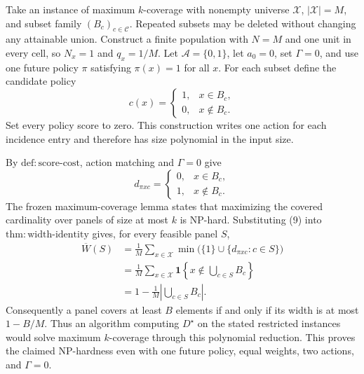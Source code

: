 Take an instance of maximum \(k\)-coverage with nonempty universe
\(\mathcal X\), \(|\mathcal X|=M\), and subset family
\((B_c)_{c\in\mathcal C}\).  Repeated subsets may be deleted without
changing any attainable union.  Construct a finite population with
\(N=M\) and one unit in every cell, so \(N_x=1\) and \(q_x=1/M\).  Let
\(\mathcal A=\{0,1\}\), let \(a_0=0\), set \(\Gamma=0\), and use one
future policy \(\pi\) satisfying \(\pi(x)=1\) for all \(x\).  For each
subset define the candidate policy
\[
c(x)=
\begin{cases}
1,&x\in B_c,\\
0,&x\notin B_c.
\end{cases}
\]
Set every policy score to zero.  This construction writes one action for
each incidence entry and therefore has size polynomial in the input size.

By \(\mathrm{def{:}score\text{-}cost}\), action matching and
\(\Gamma=0\) give
\[
d_{\pi xc}=
\begin{cases}
0,&x\in B_c,\\
1,&x\notin B_c.
\end{cases}                                                           \tag{9}
\]
The frozen maximum-coverage lemma states that maximizing the covered
cardinality over panels of size at most \(k\) is NP-hard.  Substituting (9)
into \(\mathrm{thm{:}width\text{-}identity}\) gives, for every feasible
panel \(S\),
\[
\begin{aligned}
\overline W(S)
&=\frac1M\sum_{x\in\mathcal X}
  \min\bigl(\{1\}\cup\{d_{\pi xc}:c\in S\}\bigr)\\
&=\frac1M\sum_{x\in\mathcal X}
  \mathbf 1\!\left\{x\notin\bigcup_{c\in S}B_c\right\}\\
&=1-\frac1M\left|\bigcup_{c\in S}B_c\right|.                         \tag{10}
\end{aligned}
\]
Consequently a panel covers at least \(B\) elements if and only if its
width is at most \(1-B/M\).  Thus an algorithm computing \(D^\star\) on
the stated restricted instances would solve maximum \(k\)-coverage through
this polynomial reduction.  This proves the claimed NP-hardness even with
one future policy, equal weights, two actions, and \(\Gamma=0\).

